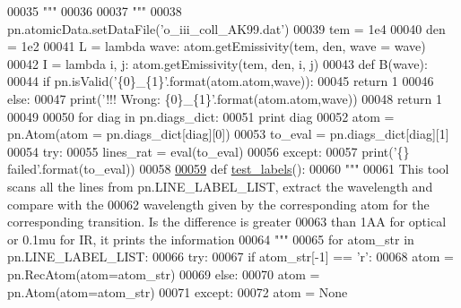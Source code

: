 \begin{DoxyCode}
00035     \textcolor{stringliteral}{"""}
00036 \textcolor{stringliteral}{}
00037 \textcolor{stringliteral}{    """}
00038     pn.atomicData.setDataFile(\textcolor{stringliteral}{'o\_iii\_coll\_AK99.dat'})
00039     tem = 1e4 
00040     den = 1e2
00041     L = \textcolor{keyword}{lambda} wave: atom.getEmissivity(tem, den, wave = wave)
00042     I = \textcolor{keyword}{lambda} i, j: atom.getEmissivity(tem, den, i, j)
00043     \textcolor{keyword}{def }B(wave):
00044         \textcolor{keywordflow}{if} pn.isValid(\textcolor{stringliteral}{'\{0\}\_\{1\}'}.format(atom.atom,wave)):
00045             \textcolor{keywordflow}{return} 1
00046         \textcolor{keywordflow}{else}:
00047             print(\textcolor{stringliteral}{'!!! Wrong: \{0\}\_\{1\}'}.format(atom.atom,wave))
00048             \textcolor{keywordflow}{return} 1
00049         
00050     \textcolor{keywordflow}{for} diag \textcolor{keywordflow}{in} pn.diags\_dict:
00051         \textcolor{keywordflow}{print} diag
00052         atom = pn.Atom(atom = pn.diags\_dict[diag][0])
00053         to\_eval = pn.diags\_dict[diag][1]
00054         \textcolor{keywordflow}{try}:
00055             lines\_rat = eval(to\_eval)
00056         \textcolor{keywordflow}{except}:
00057             print(\textcolor{stringliteral}{'\{\} failed'}.format(to\_eval))
00058             
\hypertarget{test__lines_8py_source_l00059}{}\hyperlink{namespacepyneb_1_1test_1_1test__lines_a59a9d4f79b935f54e1a4fe6186b4e539}{00059} \textcolor{keyword}{def }\hyperlink{namespacepyneb_1_1test_1_1test__lines_a59a9d4f79b935f54e1a4fe6186b4e539}{test\_labels}():
00060     \textcolor{stringliteral}{"""}
00061 \textcolor{stringliteral}{    This tool scans all the lines from pn.LINE\_LABEL\_LIST, extract the wavelength and compare with the }
00062 \textcolor{stringliteral}{    wavelength given by the corresponding atom for the corresponding transition. Is the difference is
       greater }
00063 \textcolor{stringliteral}{    than 1AA for optical or 0.1mu for IR, it prints the information}
00064 \textcolor{stringliteral}{    """}
00065     \textcolor{keywordflow}{for} atom\_str \textcolor{keywordflow}{in} pn.LINE\_LABEL\_LIST:
00066         \textcolor{keywordflow}{try}:
00067             \textcolor{keywordflow}{if} atom\_str[-1] == \textcolor{stringliteral}{'}\textcolor{stringliteral}{r':}
00068 \textcolor{stringliteral}{                atom = pn.RecAtom(atom=atom\_str)}
00069 \textcolor{stringliteral}{            }\textcolor{keywordflow}{else}:
00070                 atom = pn.Atom(atom=atom\_str)
00071         \textcolor{keywordflow}{except}:
00072             atom = \textcolor{keywordtype}{None}

\end{DoxyCode}
